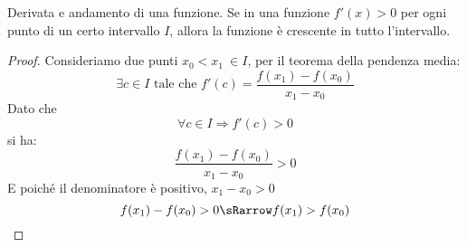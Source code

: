 \begin{corollario}
 Derivata e andamento di una funzione. Se in una funzione \(f'(x)>0\) per ogni 
punto di un certo intervallo \(I\), allora la funzione è crescente in tutto 
l'intervallo.
\end{corollario}
% 

\begin{proof}
Consideriamo due punti \(x_0 < x_1 ~ \in I\), 
per il teorema della pendenza media:
\[\exists c \in I \text { tale che } f'(c) = \dfrac{f(x_1)-f(x_0)}{x_1-x_0}\]
Dato che 
\[\forall c \in I \Rightarrow f'(c) > 0\]
si ha:
\[\dfrac{f(x_1)-f(x_0)}{x_1-x_0}>0 \]
E poiché il denominatore è positivo, \(x_1 - x_0 > 0\)
\[f(x_1)-f(x_0)>0 \sRarrow f(x_1)>f(x_0)\]
\end{proof}

% 
% 












